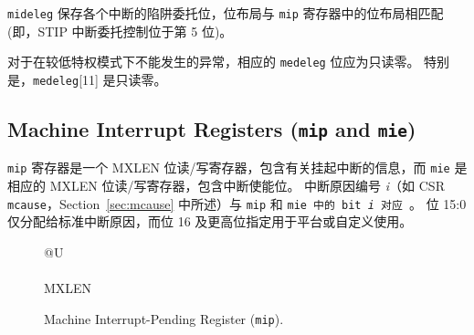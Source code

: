 \iffalse
{\tt mideleg} holds trap delegation bits for individual interrupts, with the
layout of bits matching those in the {\tt mip} register (i.e., STIP interrupt
delegation control is located in bit 5).

For exceptions that cannot occur in less privileged modes, the corresponding
{\tt medeleg} bits should be read-only zero.  In particular,
{\tt medeleg}[11] is read-only zero.
\fi

{\tt mideleg} 保存各个中断的陷阱委托位，位布局与 {\tt mip} 寄存器中的位布局相匹配(即，STIP 中断委托控制位于第 5 位)。

对于在较低特权模式下不能发生的异常，相应的 {\tt medeleg} 位应为只读零。 特别是，{\tt medeleg}[11] 是只读零。

\subsection{Machine Interrupt Registers ({\tt mip} and {\tt mie})}

\iffalse
The {\tt mip} register is an MXLEN-bit read/write register containing
information on pending interrupts, while {\tt mie} is the
corresponding MXLEN-bit read/write register containing interrupt enable
bits.
Interrupt cause number \textit{i} (as reported in CSR {\tt mcause},
Section~\ref{sec:mcause}) corresponds with bit~\textit{i} in both
{\tt mip} and {\tt mie}.
Bits 15:0 are allocated to standard interrupt causes only, while bits 16
and above are designated for platform or custom use.
\fi

{\tt mip} 寄存器是一个 MXLEN 位读/写寄存器，包含有关挂起中断的信息，而 {\tt mie} 是相应的 MXLEN 位读/写寄存器，包含中断使能位。 中断原因编号 \textit{i}（如 CSR {\tt mcause}，Section~\ref{sec:mcause} 中所述）与 {\tt mip} 和 {\tt mie 中的 bit~\textit{i} 对应 }。 位 15:0 仅分配给标准中断原因，而位 16 及更高位指定用于平台或自定义使用。

\begin{figure}[h!]
{\footnotesize
\begin{center}
\begin{tabular}{@{}U}
 \\
\hline
{} \\
\hline
MXLEN \\
\end{tabular}
\end{center}
}
\vspace{-0.1in}
\caption{Machine Interrupt-Pending Register ({\tt mip}).}
\label{mipreg}
\end{figure}

